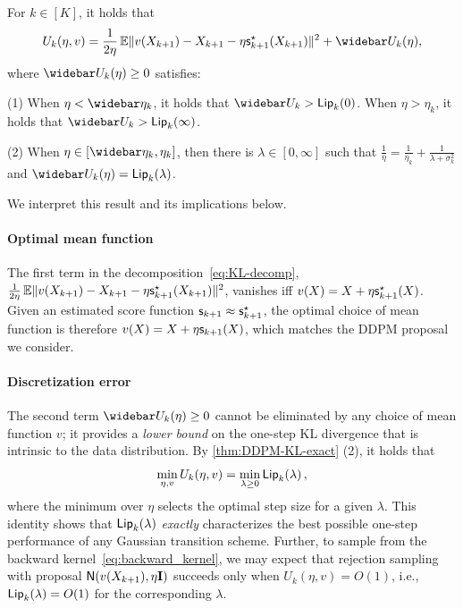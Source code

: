\begin{theorem}\label{thm:DDPM-KL-exact}
For $k\in[K]$, it holds that
\begin{align}\label{eq:KL-decomp}
    U_k(\eta, v)=\frac{1}{2\eta}\En\nrm{v(X_{k+1})-X_{k+1}-\eta\scfs_{k+1}(X_{k+1})}^2+\wb{U}_k(\eta),
\end{align}
where $\wb{U}_k(\eta)\geq 0$ satisfies:

(1) When $\eta<\etabar_k$, it holds that $\wb{U}_k>\Comp_k(0)$. When $\eta>\eta_k$, it holds that $\wb{U}_k>\Comp_k(\infty)$. 

(2) When $\eta\in[\etabar_k,\eta_k]$, then there is $\lambda\in[0,\infty]$ such that $\frac{1}{\eta}=\frac{1}{\eta_k}+\frac{1}{\lambda+\sigma_k^2}$ and $\wb{U}_k(\eta)=\Comp_k(\lambda)$.
\end{theorem}

We interpret this result and its implications below.

\paragraph{Optimal mean function}
The first term in the decomposition~\eqref{eq:KL-decomp}, $\frac{1}{2\eta}\operatorname{\mathbb{E}}\lVert v(X_{k+1})-X_{k+1}-\eta\mathsf{s}^\star_{k+1}(X_{k+1})\rVert^2$, vanishes iff $v(X)=X+\eta \mathsf{s}^\star_{k+1}(X)$. Given an estimated score function $\mathsf{s}_{k+1}\approx \mathsf{s}^\star_{k+1}$, the optimal choice of mean function is therefore $v(X)=X+\eta \mathsf{s}_{k+1}(X)$, which matches the DDPM proposal we consider.

\paragraph{Discretization error}
The second term $\wb{U}_k(\eta)\geq 0$ cannot be eliminated by any choice of mean function $v$; it provides a \emph{lower bound} on the one-step KL divergence that is intrinsic to the data distribution.
By \cref{thm:DDPM-KL-exact} (2), it holds that
\[
\min_{\eta,v} U_k(\eta, v) = \min_{\lambda\geq 0} \mathsf{Lip}_k(\lambda)\,,
\]
where the minimum over $\eta$ selects the optimal step size for a given $\lambda$. This identity shows that $\mathsf{Lip}_k(\lambda)$ \emph{exactly} characterizes the best possible one-step performance of any Gaussian transition scheme. Further, to sample from the backward kernel~\eqref{eq:backward_kernel}, we may expect that rejection sampling with proposal $\normal{v(X_{k+1}),\eta\Id}$ succeeds only when $ U_k(\eta, v)=O(1)$, i.e., $\mathsf{Lip}_k(\lambda)=O(1)$ for the corresponding $\lambda$. 

